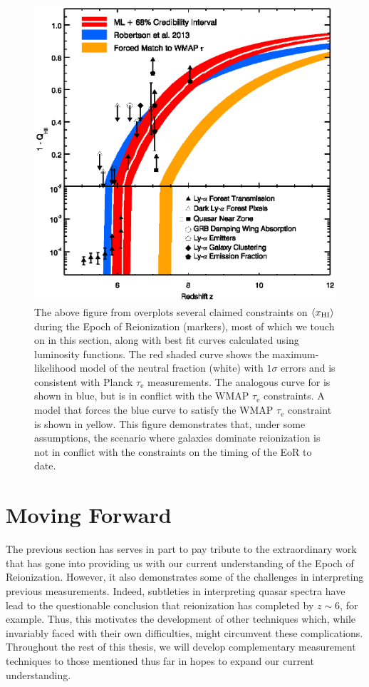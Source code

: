 \begin{figure}[!p]
  \centering
  \includegraphics[width=12cm]{Robertson2015.eps}
  \caption{The above figure from \citet{robertson2015cosmic} overplots several claimed constraints on $\langle x_{\text{HI}}\rangle$ during the Epoch of Reionization (markers), most of which we touch on in this section, along with best fit curves calculated using luminosity functions. The red shaded curve shows the maximum-likelihood model of the neutral fraction (white) with $1\sigma$ errors and is consistent with Planck $\tau_{\text{e}}$ measurements. The analogous curve for \citet{Robertson2013} is shown in blue, but is in conflict with the WMAP $\tau_{\text{e}}$ constraints. A model that forces the blue curve to satisfy the WMAP $\tau_{\text{e}}$ constraint is shown in yellow. This figure demonstrates that, under some assumptions, the scenario where galaxies dominate reionization is not in conflict with the constraints on the timing of the EoR to date.   }
  \label{fig:Robertson2015}
\end{figure}


\clearpage
\section{Moving Forward}


The previous section has serves in part to pay tribute to the extraordinary work that has gone into providing us with our current understanding of the Epoch of Reionization. However, it also demonstrates some of the challenges in interpreting previous measurements. Indeed, subtleties in interpreting quasar spectra have lead to the questionable conclusion that reionization has completed by $z \sim 6$, for example. Thus, this motivates the development of other techniques which, while invariably faced with their own difficulties, might circumvent these complications. Throughout the rest of this thesis, we will develop complementary measurement techniques to those mentioned thus far in hopes to expand our current understanding. 


